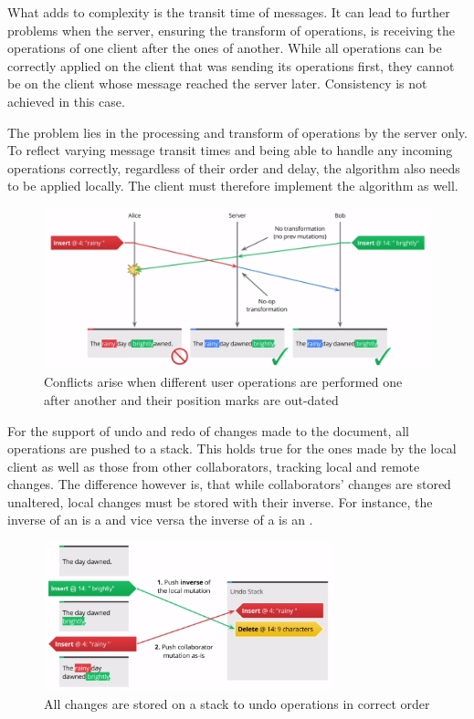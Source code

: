 What adds to complexity is the transit time of messages. It can lead to further problems when the server, ensuring the transform of operations, is receiving the operations of one client after the ones of another. While all operations can be correctly applied on the client that was sending its operations first, they cannot be on the client whose message reached the server later. Consistency is not achieved in this case.

The problem lies in the processing and transform of operations by the server only. To reflect varying message transit times and being able to handle any incoming operations correctly, regardless of their order and delay, the  algorithm also needs to be applied locally. The client must therefore implement the algorithm as well.

\begin{figure}[H] %
	\centering
		\includegraphics[width=\textwidth]{images/ot_message_transit.png}
	\caption{Conflicts arise when different user operations are performed one after another and their position marks are out-dated \cite{website:io2013-drive-api-video}}
\end{figure}

\label{subsubsec:ot-undo-and-redo}

For the support of undo and redo of changes made to the document, all operations are pushed to a stack. This holds true for the ones made by the local client as well as those from other collaborators, tracking local and remote changes. The difference however is, that while collaborators' changes are stored unaltered, local changes must be stored with their inverse. For instance, the inverse of an  is a  and vice versa the inverse of a  is an .

\begin{figure}[H] %
	\centering
		\includegraphics[width=0.75\textwidth]{images/ot_redo_stack.png}
	\caption{All changes are stored on a stack to undo operations in correct order \cite{website:io2013-drive-api-video}}
\end{figure}


